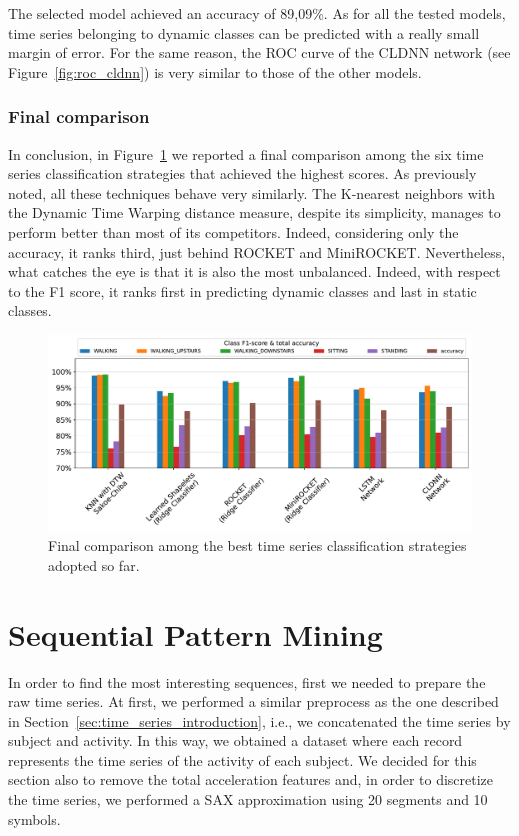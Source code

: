 \documentclass[10pt, a4paper, twocolumn]{article}
\begin{document}
The selected model achieved an accuracy of 89,09\%. As for all the tested models, time series belonging to dynamic classes can be predicted with a really small margin of error. For the same reason, the ROC curve of the CLDNN network (see Figure~\ref{fig:roc_cldnn}) is very similar to those of the other models. 

\subsubsection{Final comparison}

In conclusion, in Figure~\ref{fig:final_comparison} we reported a final comparison among the six time series classification strategies that achieved the highest scores. As previously noted, all these techniques behave very similarly.  The K-nearest neighbors with the Dynamic Time Warping distance measure, despite its simplicity, manages to perform better than most of its competitors. Indeed, considering only the accuracy, it ranks third, just behind ROCKET and MiniROCKET. Nevertheless, what catches the eye is that it is also the most unbalanced. Indeed, with respect to the F1 score, it ranks first in predicting dynamic classes and last in static classes.

\begin{figure}[h]
    \centering
    \includegraphics[width=\columnwidth]{immagini simone/output_310_0.pdf}
    \caption{Final comparison among the best time series classification strategies adopted so far.}
    \label{fig:final_comparison}
\end{figure}

\section{Sequential Pattern Mining}
In order to find the most interesting sequences, first we needed to prepare the raw time series. At first, we performed a similar preprocess as the one described in Section~\ref{sec:time_series_introduction}, i.e., we concatenated the time series by subject and activity. In this way, we obtained a dataset where each record represents the time series of the activity of each subject. We decided for this section also to remove the total acceleration features and, in order to discretize the time series, we performed a SAX approximation using 20 segments and 10 symbols. 
\end{document}
